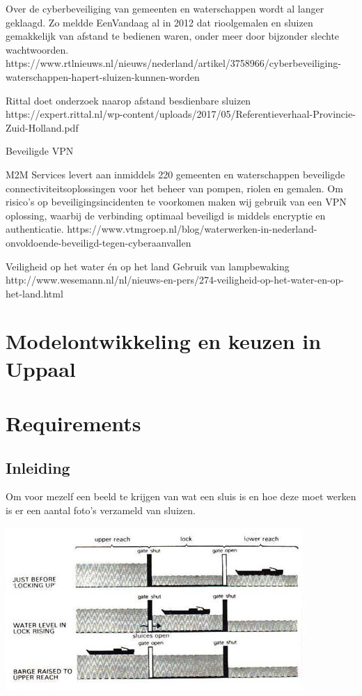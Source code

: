 {{{{{{{{{Over de cyberbeveiliging van gemeenten en waterschappen wordt al langer geklaagd. Zo meldde EenVandaag al in 2012 dat rioolgemalen en sluizen gemakkelijk van afstand te bedienen waren, onder meer door bijzonder slechte wachtwoorden.
https://www.rtlnieuws.nl/nieuws/nederland/artikel/3758966/cyberbeveiliging-waterschappen-hapert-sluizen-kunnen-worden

Rittal doet onderzoek naarop afstand besdienbare sluizen
https://expert.rittal.nl/wp-content/uploads/2017/05/Referentieverhaal-Provincie-Zuid-Holland.pdf



Beveiligde VPN

M2M Services levert aan inmiddels 220 gemeenten en waterschappen beveiligde connectiviteitsoplossingen voor het beheer van pompen, riolen en gemalen. Om risico’s op beveiligingsincidenten te voorkomen maken wij gebruik van een VPN oplossing, waarbij de verbinding optimaal beveiligd is middels encryptie en authenticatie.
https://www.vtmgroep.nl/blog/waterwerken-in-nederland-onvoldoende-beveiligd-tegen-cyberaanvallen

Veiligheid op het water én op het land
Gebruik van lampbewaking 
http://www.wesemann.nl/nl/nieuws-en-pers/274-veiligheid-op-het-water-en-op-het-land.html





\newpage
\section{Modelontwikkeling en keuzen in Uppaal}

\label{appendix}
\thispagestyle{myheadings}

\section{Requirements}
\subsection{Inleiding}
Om voor mezelf een beeld te krijgen van wat een sluis is en hoe deze moet werken is er een aantal foto's verzameld van sluizen.	

\includegraphics[scale=0.65]{sluismodel.jpg}


}}}}}}}}}
